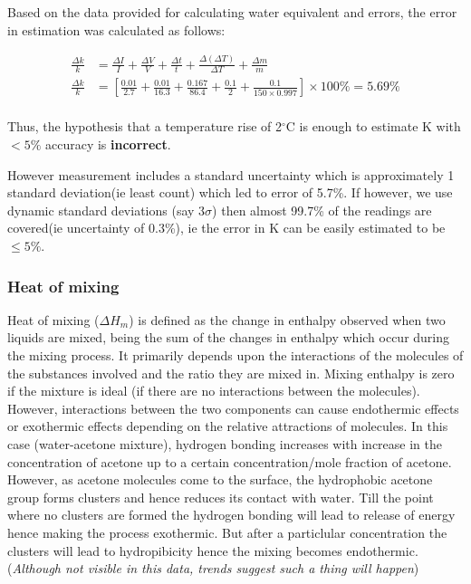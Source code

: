\documentclass[11pt]{article}
\begin{document}
Based on the data provided for calculating water equivalent and errors,
the error in estimation was calculated as follows:

\begin{equation}
  \begin{split}
    \frac{\Delta k}{k}&=\frac{\Delta I}{I}+\frac{\Delta V}{V}+\frac{\Delta t}{t}+\frac{\Delta (\Delta T)}{\Delta T}+\frac{\Delta m}{m}\\
    \frac{\Delta k}{k}&=\left[\frac{0.01}{2.7}+\frac{0.01}{16.3}+\frac{0.167}{86.4}+\frac{0.1}{2}+\frac{0.1}{150\times0.997}\right]\times100\%=5.69\%\\
  \end{split}
\end{equation}

Thus, the hypothesis that a temperature rise of 2\(^{\circ}\)C is enough
to estimate K with \(<5\%\) accuracy is \textbf{incorrect}.

However measurement includes a standard uncertainty which is approximately
1 standard deviation(ie least count) which led to error of 5.7\%. If however,
we use dynamic standard deviations (say $3\sigma$) then almost 99.7\% of
the readings are covered(ie uncertainty of 0.3\%), ie the error in K can
be easily estimated to be $\leq5\%$.

\hypertarget{heat-of-mixing}{%
  \subsubsection{Heat of mixing}\label{heat-of-mixing}}

Heat of mixing (\(\Delta H_m\)) is defined as the change in enthalpy
observed when two liquids are mixed, being the sum of the changes in
enthalpy which occur during the mixing process. It primarily depends
upon the interactions of the molecules of the substances involved and
the ratio they are mixed in. Mixing enthalpy is zero if the mixture is
ideal (if there are no interactions between the molecules). However,
interactions between the two components can cause endothermic effects or
exothermic effects depending on the relative attractions of molecules.
In this case (water-acetone mixture), hydrogen bonding increases with
increase in the concentration of acetone up to a certain
concentration/mole fraction of acetone. However, as acetone molecules
come to the surface, the hydrophobic acetone group forms clusters and
hence reduces its contact with water. Till the point where no clusters
are formed the hydrogen bonding will lead to release of energy hence
making the process exothermic. But after a particlular concentration the
clusters will lead to hydropibicity hence the mixing becomes
endothermic. (\emph{Although not visible in this data, trends suggest
  such a thing will happen})
\end{document}
